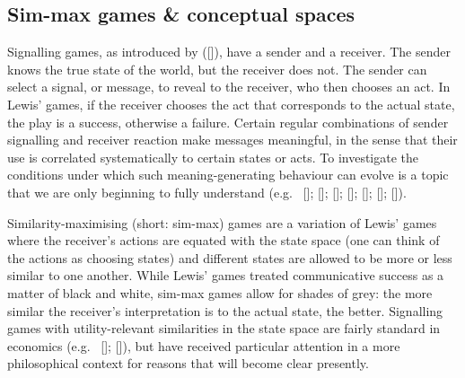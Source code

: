 \documentclass[12pt,english]{article}
\numberwithin{equation}{section}
\newcommand{\citetbjps}[1]{\citeauthor{#1} ([\citeyear{#1}])}
\newcommand{\citealtbjps}[1]{\citeauthor{#1} [\citeyear{#1}]}
\begin{document}
\subsection{Sim-max games \& conceptual spaces}

Signalling games, as introduced by \citetbjps{Lewis_1969:Convention}, have
a sender and a receiver. The sender knows the true state of the world,
but the receiver does not. The sender can select a signal, or message,
to reveal to the receiver, who then chooses an act. In Lewis' games,
if the receiver chooses the act that corresponds to the actual state,
the play is a success, otherwise a failure. Certain regular
combinations of sender signalling and receiver reaction make messages
meaningful, in the sense that their use is correlated systematically
to certain states or acts. To investigate the conditions under which
such meaning-generating behaviour can evolve is a
topic that we are only beginning to fully understand
(e.g.~\citealtbjps{Warneryd1993:Cheap-Talk-Coor}; \citealtbjps{BlumeKim1993:Evolutionary-St}; \citealtbjps{Huttegger2007:Evolution-and-t}; \citealtbjps{Pawlowitsch2008:Why-Evolution-d}; \citealtbjps{Barrett2009:The-Evolution-o}; \citealtbjps{HutteggerSkyrms2010:Evolutionary-Dy}; \citealtbjps{Skyrms2010:Signals}).

Similarity-maximising (short: sim-max) games are a variation of Lewis' games where the
receiver's actions are equated with the state space (one can think of the actions as choosing
states) and different states are allowed to be more or less similar to one another. While
Lewis' games treated communicative success as a matter of black and white, sim-max games allow
for shades of grey: the more similar the receiver's interpretation is to the actual state, the
better. Signalling games with utility-relevant similarities in the state space are fairly
standard in economics
(e.g.~\citealtbjps{Spence1973:Job-market-sign}; \citealtbjps{CrawfordSobel1982:Strategic-Infor}), but have received
particular attention in a more philosophical context for reasons that will become clear
presently.
\end{document}
